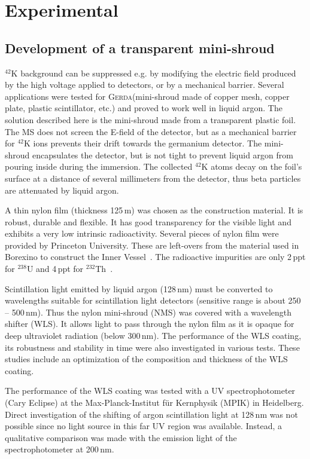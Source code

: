 \documentclass[twocolumn,epjc3]{svjour3}
\newcommand{\Gerda} {{\textsc{Gerda}\xspace}}
\newcommand{\I}[2]{$^{#1}$#2}
\begin{document}
\section{Experimental}
\label{sec:exper}
%
\subsection{Development of a transparent mini-shroud}
\label{sec:devMS}
%
 \I{42}{K} background can be suppressed e.g. by modifying the electric field produced by the high voltage applied to detectors, or by a mechanical barrier. Several applications were tested for \Gerda{}(mini-shroud made of copper mesh, copper plate, plastic scintillator, etc.) and proved to work well in liquid argon. The solution described here is the mini-shroud made from a transparent plastic foil. The MS does not screen the E-field of the detector, but as a mechanical barrier for \I{42}{K} ions prevents their drift towards the germanium detector. The mini-shroud encapsulates the detector, but is not tight to prevent liquid argon from pouring inside during the immersion. The collected \I{42}{K} atoms decay on the foil's surface at a distance of several millimeters from the detector, thus beta particles are attenuated by liquid argon.

A thin nylon film (thickness 125\,\textmu m) was chosen as the construction material. It is robust, durable and flexible. It has good transparency for the visible light and exhibits a very low intrinsic radioactivity. Several pieces of nylon film were provided by Princeton University. These are left-overs from the material used in Borexino to construct the Inner Vessel~\cite{bor_vessel}. The radioactive impurities are only 2\,ppt for \I{238}{U} and 4\,ppt for \I{232}{Th}~\cite{bor_catt}. 

Scintillation light emitted by liquid argon (128\,nm) must be converted to wavelengths suitable for scintillation light detectors (sensitive range is about 250 -- 500\,nm). Thus the nylon mini-shroud (NMS) was covered with a wavelength shifter (WLS). It allows light to pass through the nylon film as it is opaque for deep ultraviolet radiation (below 300\,nm). The performance of the WLS coating, its robustness and stability in time were also investigated in various tests. These studies include an optimization of the composition and thickness of the WLS coating.

The performance of the WLS coating was tested with a UV spectrophotometer (Cary Eclipse) at the Max-Planck-Institut f\"{u}r Kernphysik (MPIK) in Heidelberg. Direct investigation of the shifting of argon scintillation light at 128\,nm was not possible since no light source in this far UV region was available. Instead, a qualitative comparison was made with the emission light of the spectrophotometer at 200\,nm.
  
\end{document}

